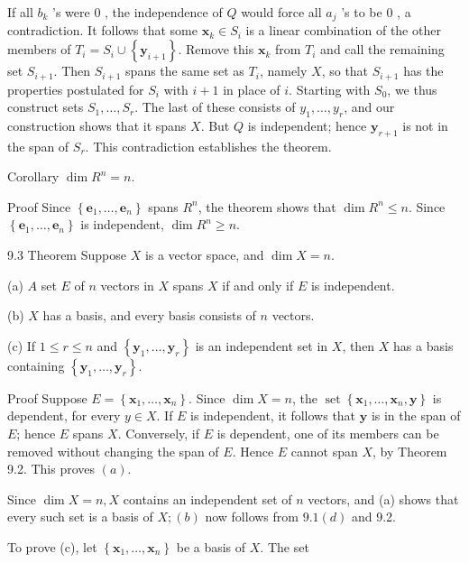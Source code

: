 \documentclass[10pt]{article}
\begin{document}
If all $b_{k}$ 's were 0 , the independence of $Q$ would force all $a_{j}$ 's to be 0 , a contradiction. It follows that some $\mathbf{x}_{k} \in S_{i}$ is a linear combination of the other members of $T_{i}=S_{i} \cup\left\{\mathbf{y}_{i+1}\right\}$. Remove this $\mathbf{x}_{k}$ from $T_{i}$ and call the remaining set $S_{i+1}$. Then $S_{i+1}$ spans the same set as $T_{i}$, namely $X$, so that $S_{i+1}$ has the properties postulated for $S_{i}$ with $i+1$ in place of $i$. Starting with $S_{0}$, we thus construct sets $S_{1}, \ldots, S_{r}$. The last of these consists of $y_{1}, \ldots, y_{r}$, and our construction shows that it spans $X$. But $Q$ is independent; hence $\mathbf{y}_{r+1}$ is not in the span of $S_{r}$. This contradiction establishes the theorem.

Corollary $\operatorname{dim} R^{n}=n$.

Proof Since $\left\{\mathbf{e}_{1}, \ldots, \mathbf{e}_{n}\right\}$ spans $R^{n}$, the theorem shows that $\operatorname{dim} R^{n} \leq n$. Since $\left\{\mathbf{e}_{1}, \ldots, \mathbf{e}_{n}\right\}$ is independent, $\operatorname{dim} R^{n} \geq n$.

9.3 Theorem Suppose $X$ is a vector space, and $\operatorname{dim} X=n$.

(a) $A$ set $E$ of $n$ vectors in $X$ spans $X$ if and only if $E$ is independent.

(b) $X$ has a basis, and every basis consists of $n$ vectors.

(c) If $1 \leq r \leq n$ and $\left\{\mathbf{y}_{1}, \ldots, \mathbf{y}_{r}\right\}$ is an independent set in $X$, then $X$ has a basis containing $\left\{\mathbf{y}_{1}, \ldots, \mathbf{y}_{r}\right\}$.

Proof Suppose $E=\left\{\mathbf{x}_{1}, \ldots, \mathbf{x}_{n}\right\}$. Since $\operatorname{dim} X=n$, the $\operatorname{set}\left\{\mathbf{x}_{1}, \ldots, \mathbf{x}_{n}, \mathbf{y}\right\}$ is dependent, for every $y \in X$. If $E$ is independent, it follows that $\mathbf{y}$ is in the span of $E$; hence $E$ spans $X$. Conversely, if $E$ is dependent, one of its members can be removed without changing the span of $E$. Hence $E$ cannot span $X$, by Theorem 9.2. This proves $(a)$.

Since $\operatorname{dim} X=n, X$ contains an independent set of $n$ vectors, and (a) shows that every such set is a basis of $X ;(b)$ now follows from $9.1(d)$ and 9.2.

To prove (c), let $\left\{\mathbf{x}_{1}, \ldots, \mathbf{x}_{n}\right\}$ be a basis of $X$. The set
\end{document}
